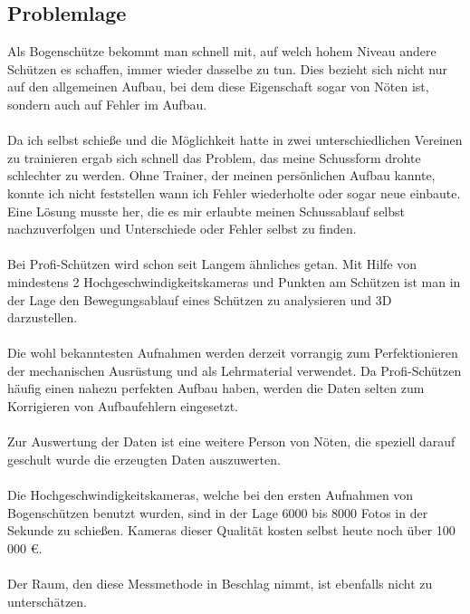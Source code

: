 \subsection{Problemlage}
Als Bogenschütze bekommt man schnell mit, auf welch hohem Niveau andere Schützen es 
schaffen, immer wieder dasselbe zu tun. Dies bezieht sich nicht nur auf den allgemeinen 
Aufbau, bei dem diese Eigenschaft sogar von Nöten ist, sondern auch auf Fehler im Aufbau.\\
\\
Da ich selbst schieße und die Möglichkeit hatte in zwei unterschiedlichen Vereinen zu 
trainieren ergab sich schnell das Problem, das meine Schussform drohte schlechter zu 
werden. Ohne Trainer, der meinen persönlichen Aufbau kannte, konnte ich nicht feststellen 
wann ich Fehler wiederholte oder sogar neue einbaute. Eine Lösung musste her, die es mir 
erlaubte meinen Schussablauf selbst nachzuverfolgen und Unterschiede oder Fehler selbst zu 
finden.\\
\\
Bei Profi-Schützen wird schon seit Langem ähnliches getan. Mit Hilfe von mindestens 2 
Hochgeschwindigkeitskameras und Punkten am Schützen ist man in der Lage den 
Bewegungsablauf eines Schützen zu analysieren und 3D darzustellen.\\
\\
Die wohl bekanntesten Aufnahmen werden derzeit vorrangig zum Perfektionieren der 
mechanischen Ausrüstung und als Lehrmaterial verwendet. Da Profi-Schützen häufig einen 
nahezu perfekten Aufbau haben, werden die Daten selten zum Korrigieren von Aufbaufehlern 
eingesetzt.\\
\\
Zur Auswertung der Daten ist eine weitere Person von Nöten, die speziell darauf geschult 
wurde die erzeugten Daten auszuwerten.\\
\\
Die Hochgeschwindigkeitskameras, welche bei den ersten Aufnahmen von Bogenschützen 
benutzt wurden, sind in der Lage 6000 bis 8000 Fotos in der Sekunde zu schießen. Kameras 
dieser Qualität kosten selbst heute noch über 100 000 \euro{}.\\
\\
Der Raum, den diese Messmethode in Beschlag nimmt, ist ebenfalls nicht zu unterschätzen.

